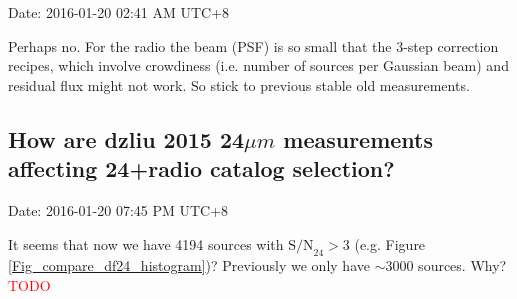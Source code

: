 \documentclass[11pt,a4paper]{article}
\begin{document}
\textcolor{green!90!black!60!orange}{Date: 2016-01-20 02:41 AM UTC+8}

Perhaps no. For the radio the beam (PSF) is so small that the 3-step correction recipes, which involve crowdiness (i.e. number of sources per Gaussian beam) and residual flux might not work. So stick to previous stable old measurements. 

\subsection{How are dzliu 2015 24${\mu}m$ measurements affecting 24+radio catalog selection?}

\textcolor{green!90!black!60!orange}{Date: 2016-01-20 07:45 PM UTC+8}

It seems that now we have 4194 sources with $\mathrm{S/N}_{24}>3$ (e.g. Figure \ref{Fig_compare_df24_histogram})? Previously we only have $\sim3000$ sources. Why? \textcolor{red}{TODO}


\clearpage

\end{document}
